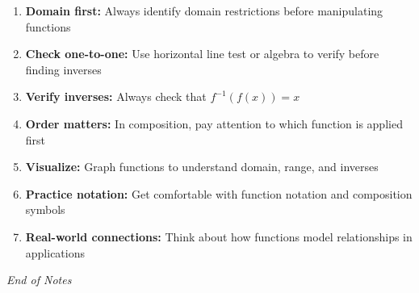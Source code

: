\documentclass[12pt,a4paper]{article}
\begin{document}
\begin{enumerate}
    \item \textbf{Domain first:} Always identify domain restrictions before manipulating functions
    
    \item \textbf{Check one-to-one:} Use horizontal line test or algebra to verify before finding inverses
    
    \item \textbf{Verify inverses:} Always check that $f^{-1}(f(x)) = x$
    
    \item \textbf{Order matters:} In composition, pay attention to which function is applied first
    
    \item \textbf{Visualize:} Graph functions to understand domain, range, and inverses
    
    \item \textbf{Practice notation:} Get comfortable with function notation and composition symbols
    
    \item \textbf{Real-world connections:} Think about how functions model relationships in applications
\end{enumerate}

\vfill
\begin{center}
\textit{End of Notes}
\end{center}
\end{document}
